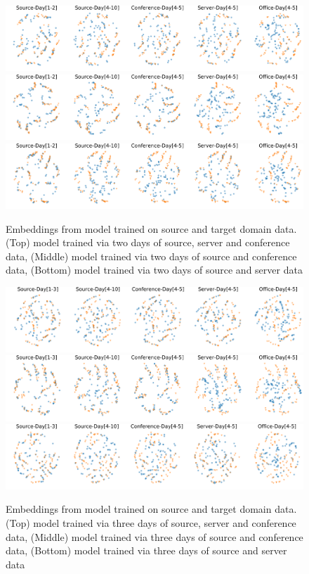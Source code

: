 \documentclass{article}
\begin{document}
\begin{figure}[H]
\includegraphics[width=\linewidth]{figures_supp/TargetLabelled222.png} 
\includegraphics[width=\linewidth]{figures_supp/TargetLabelled202.png} 
\includegraphics[width=\linewidth]{figures_supp/TargetLabelled220.png} 
\caption{Embeddings from model trained on source and target domain data. (Top) model trained via two days of source, server and conference data, (Middle) model trained via two days of source and conference data, (Bottom) model trained via two days of source and server data}
\label{trg2}
\end{figure}

\begin{figure}[H]
\includegraphics[width=\linewidth]{figures_supp/TargetLabelled333.png} 
\includegraphics[width=\linewidth]{figures_supp/TargetLabelled303.png} 
\includegraphics[width=\linewidth]{figures_supp/TargetLabelled330.png} 
\caption{Embeddings from model trained on source and target domain data. (Top) model trained via three days of source, server and conference data, (Middle) model trained via three days of source and conference data, (Bottom) model trained via three days of source and server data}
\label{trg3}
\end{figure}
\end{document}
